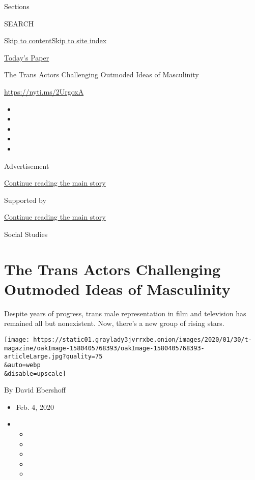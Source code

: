 Sections

SEARCH

\protect\hyperlink{site-content}{Skip to
content}\protect\hyperlink{site-index}{Skip to site index}

\href{https://myaccount.nytimes3xbfgragh.onion/auth/login?response_type=cookie\&client_id=vi}{}

\href{https://www.nytimes3xbfgragh.onion/section/todayspaper}{Today's
Paper}

The Trans Actors Challenging Outmoded Ideas of Masculinity

\url{https://nyti.ms/2UrgoxA}

\begin{itemize}
\item
\item
\item
\item
\item
\end{itemize}

Advertisement

\protect\hyperlink{after-top}{Continue reading the main story}

Supported by

\protect\hyperlink{after-sponsor}{Continue reading the main story}

Social Studies

\hypertarget{the-trans-actors-challenging-outmoded-ideas-of-masculinity}{%
\section{The Trans Actors Challenging Outmoded Ideas of
Masculinity}\label{the-trans-actors-challenging-outmoded-ideas-of-masculinity}}

Despite years of progress, trans male representation in film and
television has remained all but nonexistent. Now, there's a new group of
rising stars.

\texttt{[image: https://static01.graylady3jvrrxbe.onion/images/2020/01/30/t-magazine/oakImage-1580405768393/oakImage-1580405768393-articleLarge.jpg?quality=75\\\&auto=webp\\\&disable=upscale]}

By David Ebershoff

\begin{itemize}
\item
  Feb. 4, 2020
\item
  \begin{itemize}
  \item
  \item
  \item
  \item
  \item
  \end{itemize}
\end{itemize}

